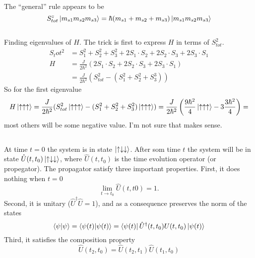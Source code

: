 \documentclass{article}
\begin{document}
The ``general'' rule appears to be
\begin{equation}
S^z_{tot}\ket{m_{s1}m_{s2}m_{s3}}=\hbar (m_{s1}+m_{s2}+m_{s3})\ket{m_{s1}m_{s2}m_{s3}}
\end{equation}


\subsection{}
Finding eigenvalues of $H$. The trick is first to express $H$ in terms of $S_{tot}^2$.
\begin{align*}
S_tot^2 &= S_1^2 + S_2^2 + S_3^2 + 2S_1\cdot S_2 + 2S_2\cdot S_3 + 2S_3\cdot S_1 \\
H &= \frac{J}{2\hbar^2}(2S_1\cdot S_2 + 2S_2\cdot S_3 + 2S_3\cdot S_1) \\
  &= \frac{J}{2\hbar^2}(S_{tot}^2-(S_1^2+S_2^2+S_3^3))
\end{align*}
So for the first eigenvalue
\begin{equation*}
H\ket{\uparrow\uparrow\uparrow} = \frac{J}{2\hbar^2}(S_{tot}^2\ket{\uparrow\uparrow\uparrow}-(S_1^2+S_2^2+S_3^2)\ket{\uparrow\uparrow\uparrow})=\frac{J}{2\hbar^2}\left(\frac{9\hbar^2}{4}\ket{\uparrow\uparrow\uparrow} -3\frac{3\hbar^2}{4} \right) = 
\end{equation*}
most others will be some negative value. I'm not sure that makes sense.


\subsection{}


\subsection{}
At time $t=0$ the system is in state $\ket{\uparrow\downarrow\downarrow}$. After som time $t$ the system will be in state $\hat{U}(t,t_0)\ket{\uparrow\downarrow\downarrow}$, where $\hat{U}(t,t_0)$ is the time evolution operator (or propegator). The propagator satisfy three important properties. First, it does nothing when $t=0$
\begin{equation}
\lim_{t\to t_0}\hat{U}(t,t0)=1.
\end{equation}
Second, it is unitary ($\hat{U}^{\dagger}\hat{U}=1$), and as a consequence preserves the norm of the states
\begin{equation}
\braket{\psi} = \braket{\psi(t)} = \bra{\psi(t)} \hat{U}^{\dagger}(t,t_0){U}(t,t_0) \ket{\psi(t)}
\end{equation}
Third, it satisfies the composition property
\begin{equation}
\hat{U}(t_2,t_0)=\hat{U}(t_2,t_1)\hat{U}(t_1,t_0)
\end{equation}
\end{document}
